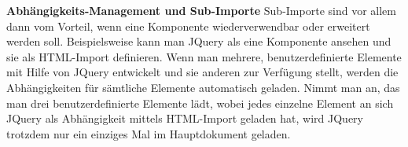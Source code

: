 \textbf{Abhängigkeits-Management und Sub-Importe}
Sub-Importe sind vor allem dann vom Vorteil, wenn eine Komponente wiederverwendbar oder erweitert werden soll. Beispielsweise kann man JQuery als eine Komponente ansehen und sie als HTML-Import definieren. Wenn man mehrere, benutzerdefinierte Elemente mit Hilfe von JQuery entwickelt und sie anderen zur Verfügung stellt, werden die Abhängigkeiten für sämtliche Elemente automatisch geladen. Nimmt man an, das man drei benutzerdefinierte Elemente lädt, wobei jedes einzelne Element an sich JQuery als Abhängigkeit mittels HTML-Import geladen hat, wird JQuery trotzdem nur ein einziges Mal im Hauptdokument geladen.